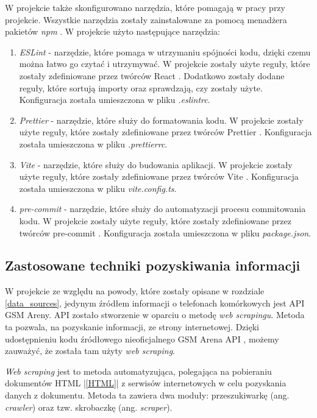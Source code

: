 W projekcie także skonfigurowano narzędzia, które pomagają w pracy przy projekcie. Wszystkie narzędzia zostały zainstalowane za pomocą menadżera pakietów \textit{npm} \cite{npm}. W projekcie użyto następujące narzędzia:
\begin{enumerate}
    \item \textit{ESLint} \cite{ESLint} - narzędzie, które pomaga w utrzymaniu spójności kodu, dzięki czemu można łatwo go czytać i utrzymywać. W projekcie zostały użyte reguły, które zostały zdefiniowane przez twórców React \cite{React}. Dodatkowo zostały dodane reguły, które sortują importy oraz sprawdzają, czy zostały użyte. Konfiguracja została umieszczona w pliku \textit{.eslintrc}.
    \item \textit{Prettier} \cite{Prettier} - narzędzie, które służy do formatowania kodu. W projekcie zostały użyte reguły, które zostały zdefiniowane przez twórców Prettier \cite{Prettier}. Konfiguracja została umieszczona w pliku \textit{.prettierrc}.
    \item \textit{Vite} \cite{vite} - narzędzie, które służy do budowania aplikacji. W projekcie zostały użyte reguły, które zostały zdefiniowane przez twórców Vite \cite{vite}. Konfiguracja została umieszczona w pliku \textit{vite.config.ts}.
    \item \textit{pre-commit} \cite{pre_commit} - narzędzie, które służy do automatyzacji procesu commitowania kodu. W projekcie zostały użyte reguły, które zostały zdefiniowane przez twórców pre-commit \cite{pre_commit}. Konfiguracja została umieszczona w pliku \textit{package.json}.
\end{enumerate}

\subsection{Zastosowane techniki pozyskiwania informacji}
W projekcie ze względu na powody, które zostały opisane w rozdziale \ref{data_sources}, jedynym źródłem informacji o telefonach komórkowych jest API GSM Areny. API zostało stworzenie w oparciu o metodę \textit{web scrapingu}. Metoda ta pozwala, na pozyskanie informacji, ze strony internetowej. Dzięki udostępnieniu kodu źródłowego nieoficjalnego GSM Arena API \cite{gsm_arena_api}, możemy zauważyć, że została tam użyty \textit{web scraping}.

\textit{Web scraping} \cite{web_scraping} jest to metoda automatyzująca, polegająca na pobieraniu dokumentów HTML |\ref{HTML}| z serwisów internetowych w celu pozyskania danych z dokumentu. Metoda ta zawiera dwa moduły: przeszukiwarkę (ang. \textit{crawler}) oraz tzw. skrobaczkę (ang. \textit{scraper}).

